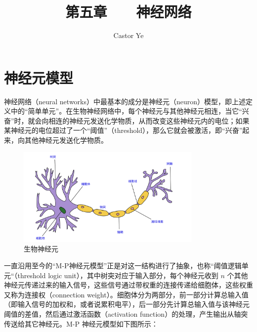 \documentclass[12pt, a4paper]{article} %
\title{第五章 \ \ \ 神经网络} %
\author{Castor Ye} %
\date{} %
\begin{document}
\maketitle %
\newtheorem{definition}{定义}[section]
\newtheorem{theorem}{定理}[section]
\newtheorem{example}{例}[section]
\newtheorem{solution}{题解}
\newtheorem{algorithm}{算法}
\newtheorem{axiom}{公理}
\newtheorem{property}{性质}
\newtheorem{proposition}{命题}
\newtheorem{lemma}{引理}
\newtheorem{corollary}{推论}[section]
\newtheorem{remark}{注解}
\newtheorem{condition}{条件}
\newtheorem{conclusion}{结论}
\newtheorem{assumption}{假设}
\renewcommand{\figurename}{图} %
\renewcommand{\tablename}{表} %
\section{神经元模型}

神经网络（neural networks）中最基本的成分是神经元（neuron）模型，即上述定义中的“简单单元”。在生物神经网络中，每个神经元与其他神经元相连，当它“兴奋”时，就会向相连的神经元发送化学物质，从而改变这些神经元内的电位；如果某神经元的电位超过了一个“阈值”（threshold），那么它就会被激活，即“兴奋”起来，向其他神经元发送化学物质。

\begin{figure}[H]
    \centering
    \includegraphics[width=0.8\textwidth]{../img/5-1-生物神经元.png}
    \caption{生物神经元}
    \label{fig:生物神经元}
\end{figure}

一直沿用至今的“M-P神经元模型”正是对这一结构进行了抽象，也称“阈值逻辑单元“（threshold logic unit），其中树突对应于输入部分，每个神经元收到 $n$ 个其他神经元传递过来的输入信号，这些信号通过带权重的连接传递给细胞体，这些权重又称为连接权（connection weight）。细胞体分为两部分，前一部分计算总输入值（即输入信号的加权和，或者说累积电平），后一部分先计算总输入值与该神经元阈值的差值，然后通过激活函数（activation function）的处理，产生输出从轴突传送给其它神经元。M-P 神经元模型如下图所示：
\end{document}
